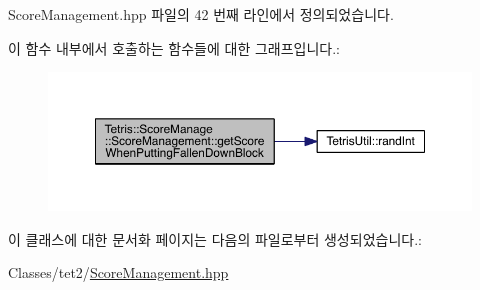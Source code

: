 Score\+Management.\+hpp 파일의 42 번째 라인에서 정의되었습니다.

이 함수 내부에서 호출하는 함수들에 대한 그래프입니다.\+:
\nopagebreak
\begin{figure}[H]
\begin{center}
\leavevmode
\includegraphics[width=350pt]{class_tetris_1_1_score_manage_1_1_score_management_a275253fb7c1bb1820ddba3b666b9db09_cgraph}
\end{center}
\end{figure}


이 클래스에 대한 문서화 페이지는 다음의 파일로부터 생성되었습니다.\+:\begin{DoxyCompactItemize}
\item 
Classes/tet2/\hyperlink{_score_management_8hpp}{Score\+Management.\+hpp}\end{DoxyCompactItemize}
